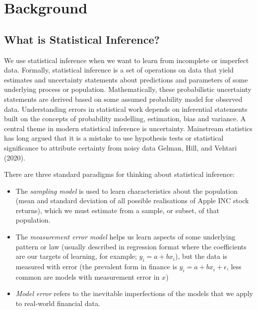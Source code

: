 \documentclass{article}
\providecommand{\tightlist}{%
  \setlength{\itemsep}{0pt}\setlength{\parskip}{0pt}}
\begin{document}
\hypertarget{background}{%
\section{Background}\label{background}}

\hypertarget{what-is-statistical-inference}{%
\subsection{What is Statistical
Inference?}\label{what-is-statistical-inference}}

We use statistical inference when we want to learn from incomplete or
imperfect data. Formally, statistical inference is a set of operations
on data that yield estimates and uncertainty statements about
predictions and parameters of some underlying process or population.
Mathematically, these probabilistic uncertainty statements are derived
based on some assumed probability model for observed data. Understanding
errors in statistical work depends on inferential statements built on
the concepts of probability modelling, estimation, bias and variance. A
central theme in modern statistical inference is uncertainty. Mainstream
statistics has long argued that it is a mistake to use hypothesis tests
or statistical significance to attribute certainty from noisy data
Gelman, Hill, and Vehtari (2020).

There are three standard paradigms for thinking about statistical
inference:

\begin{itemize}
\tightlist
\item
  The \emph{sampling model} is used to learn characteristics about the
  population (mean and standard deviation of all possible realisations
  of Apple INC stock returns), which we must estimate from a sample, or
  subset, of that population.
\item
  The \emph{measurement error model} helps us learn aspects of some
  underlying pattern or law (usually described in regression format
  where the coefficients are our targets of learning, for example;
  \(y_i=a+bx_i\)), but the data is measured with error (the prevalent
  form in finance is \(y_i=a+bx_i+\epsilon\), less common are models
  with measurement error in \(x\))
\item
  \emph{Model error} refers to the inevitable imperfections of the
  models that we apply to real-world financial data.
\end{itemize}
\end{document}
